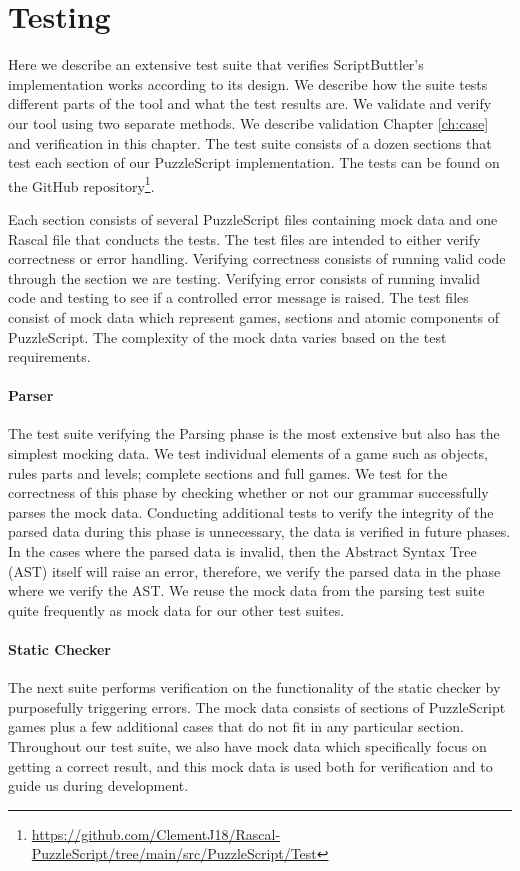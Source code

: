 \section{Testing}
\label{sec:testing}
Here we describe an extensive test suite that verifies ScriptButtler's implementation works according to its design. We describe how the suite tests different parts of the tool and what the test results are. We validate and verify our tool using two separate methods. We describe validation Chapter \ref{ch:case} and verification in this chapter. The test suite consists of a dozen sections that test each section of our PuzzleScript implementation. The tests can be found on the GitHub repository\footnote{\url{https://github.com/ClementJ18/Rascal-PuzzleScript/tree/main/src/PuzzleScript/Test}}.

Each section consists of several PuzzleScript files containing mock data and one Rascal file that conducts the tests. The test files are intended to either verify correctness or error handling. Verifying correctness consists of running valid code through the section we are testing. Verifying error consists of running invalid code and testing to see if a controlled error message is raised. The test files consist of mock data which represent games, sections and atomic components of PuzzleScript. The complexity of the mock data varies based on the test requirements.

\paragraph{Parser}
The test suite verifying the Parsing phase is the most extensive but also has the simplest mocking data. We test individual elements of a game such as objects, rules parts and levels; complete sections and full games. We test for the correctness of this phase by checking whether or not our grammar successfully parses the mock data. Conducting additional tests to verify the integrity of the parsed data during this phase is unnecessary, the data is verified in future phases. In the cases where the parsed data is invalid, then the Abstract Syntax Tree (AST) itself will raise an error, therefore, we verify the parsed data in the phase where we verify the AST. We reuse the mock data from the parsing test suite quite frequently as mock data for our other test suites. 


\paragraph{Static Checker}
The next suite performs verification on the functionality of the static checker by purposefully triggering errors. The mock data consists of sections of PuzzleScript games plus a few additional cases that do not fit in any particular section. Throughout our test suite, we also have mock data which specifically focus on getting a correct result, and this mock data is used both for verification and to guide us during development.

